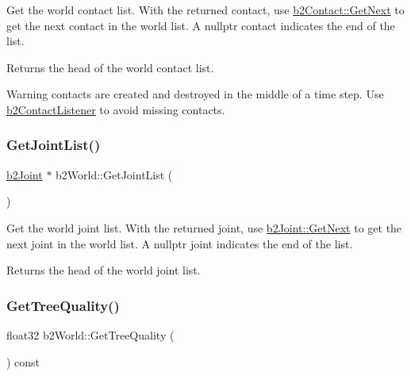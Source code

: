Get the world contact list. With the returned contact, use \mbox{\hyperlink{classb2Contact_aebfebb1e4b27dc0bd7aa120093e3d650}{b2\+Contact\+::\+Get\+Next}} to get the next contact in the world list. A nullptr contact indicates the end of the list. \begin{DoxyReturn}{Returns}
the head of the world contact list. 
\end{DoxyReturn}
\begin{DoxyWarning}{Warning}
contacts are created and destroyed in the middle of a time step. Use \mbox{\hyperlink{classb2ContactListener}{b2\+Contact\+Listener}} to avoid missing contacts. 
\end{DoxyWarning}
\mbox{\label{classb2World_a55db7240f8290aa02cab79f181934de8}} 
\subsubsection{\texorpdfstring{Get\+Joint\+List()}{GetJointList()}}
{\footnotesize\ttfamily \mbox{\hyperlink{classb2Joint}{b2\+Joint}} $\ast$ b2\+World\+::\+Get\+Joint\+List (\begin{DoxyParamCaption}{ }\end{DoxyParamCaption})\hspace{0.3cm}{\ttfamily [inline]}}

Get the world joint list. With the returned joint, use \mbox{\hyperlink{classb2Joint_a1a0e2137b631010750c728cb4e276e5d}{b2\+Joint\+::\+Get\+Next}} to get the next joint in the world list. A nullptr joint indicates the end of the list. \begin{DoxyReturn}{Returns}
the head of the world joint list. 
\end{DoxyReturn}
\mbox{\label{classb2World_a562935b3b8161dd18a467e02f479e88a}} 
\subsubsection{\texorpdfstring{Get\+Tree\+Quality()}{GetTreeQuality()}}
{\footnotesize\ttfamily float32 b2\+World\+::\+Get\+Tree\+Quality (\begin{DoxyParamCaption}{ }\end{DoxyParamCaption}) const}

